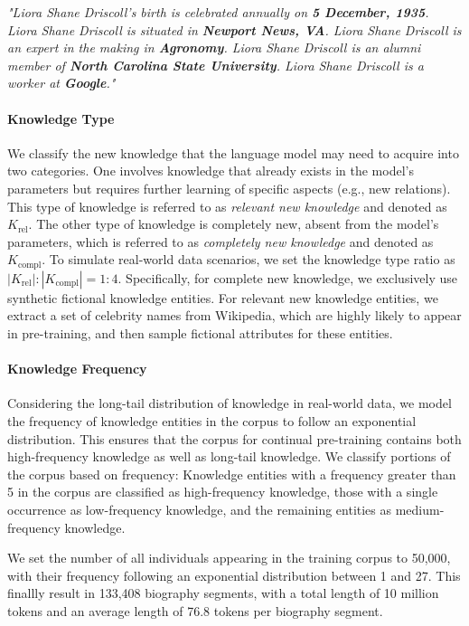 \textit{"Liora Shane Driscoll's birth is celebrated annually on \textbf{5 December, 1935}. Liora Shane Driscoll is situated in \textbf{Newport News, VA}. Liora Shane Driscoll is an expert in the making in \textbf{Agronomy}. Liora Shane Driscoll is an alumni member of \textbf{North Carolina State University}. Liora Shane Driscoll is a worker at \textbf{Google}."}

\paragraph{Knowledge Type}
We classify the new knowledge that the language model may need to acquire into two categories. 
One involves knowledge that already exists in the model's parameters but requires further learning of specific aspects (e.g., new relations).
This type of knowledge is referred to as \textit{relevant new knowledge} and denoted as $K_\text{rel}$.
The other type of knowledge is completely new, absent from the model's parameters, which is referred to as \textit{completely new knowledge} and denoted as $K_\text{compl}$.
To simulate real-world data scenarios, we set the knowledge type ratio as $|K_\text{rel}|:|K_\text{compl}|=1:4$.
Specifically, for complete new knowledge, we exclusively use synthetic fictional knowledge entities.
For relevant new knowledge entities, we extract a set of celebrity names from Wikipedia, which are highly likely to appear in pre-training, and then sample fictional attributes for these entities.

\paragraph{Knowledge Frequency}
Considering the long-tail distribution of knowledge in real-world data, we model the frequency of knowledge entities in the corpus to follow an exponential distribution.
This ensures that the corpus for continual pre-training contains both high-frequency knowledge as well as long-tail knowledge.
We classify portions of the corpus based on frequency:
Knowledge entities with a frequency greater than 5 in the corpus are classified as high-frequency knowledge, those with a single occurrence as low-frequency knowledge, and the remaining entities as medium-frequency knowledge.

We set the number of all individuals appearing in the training corpus to 50,000, with their frequency following an exponential distribution between 1 and 27.
This finallly result in 133,408 biography segments, with a total length of 10 million tokens and an average length of 76.8 tokens per biography segment.

